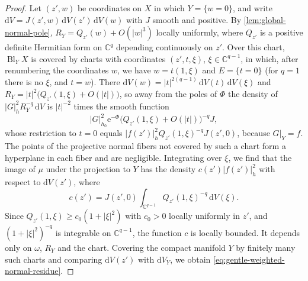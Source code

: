 \begin{proof}
Let $(z',w)$ be coordinates on $X$ in which $Y=\{w=0\}$, and write $\mathrm dV=J(z',w)\,\mathrm dV(z')\,\mathrm dV(w)$ with $J$ smooth and positive. By \cref{lem:global-normal-pole}, $R_Y=Q_{z'}(w)+O(|w|^3)$ locally uniformly, where $Q_{z'}$ is a positive definite Hermitian form on $\mathbb C^q$ depending continuously on $z'$. Over this chart, $\operatorname{Bl}_YX$ is covered by charts with coordinates $(z',t,\xi)$, $\xi\in\mathbb C^{q-1}$, in which, after renumbering the coordinates $w$, we have $w=t(1,\xi)$ and $E=\{t=0\}$ (for $q=1$ there is no $\xi$, and $t=w$). There $\mathrm dV(w)=|t|^{2(q-1)}\,\mathrm dV(t)\,\mathrm dV(\xi)$ and $R_Y=|t|^2\bigl(Q_{z'}(1,\xi)+O(|t|)\bigr)$, so away from the poles of $\Phi$ the density of $|G|_h^2R_Y^{-q}\,\mathrm dV$ is $|t|^{-2}$ times the smooth function
\[
 |G|_{h_0}^2\mathrm e^{-\Phi}\bigl(Q_{z'}(1,\xi)+O(|t|)\bigr)^{-q}J,
\]
whose restriction to $t=0$ equals $|f(z')|_h^2Q_{z'}(1,\xi)^{-q}J(z',0)$, because $G|_Y=f$. The points of the projective normal fibers not covered by such a chart form a hyperplane in each fiber and are negligible. Integrating over $\xi$, we find that the image of $\mu$ under the projection to $Y$ has the density $c(z')|f(z')|_h^2$ with respect to $\mathrm dV(z')$, where
\[
 c(z')=J(z',0)\int_{\mathbb C^{q-1}}Q_{z'}(1,\xi)^{-q}\,\mathrm dV(\xi).
\]
Since $Q_{z'}(1,\xi)\geq c_0(1+|\xi|^2)$ with $c_0>0$ locally uniformly in $z'$, and $(1+|\xi|^2)^{-q}$ is integrable on $\mathbb C^{q-1}$, the function $c$ is locally bounded. It depends only on $\omega$, $R_Y$ and the chart. Covering the compact manifold $Y$ by finitely many such charts and comparing $\mathrm dV(z')$ with $\mathrm dV_Y$, we obtain \eqref{eq:gentle-weighted-normal-residue}.
\end{proof}

